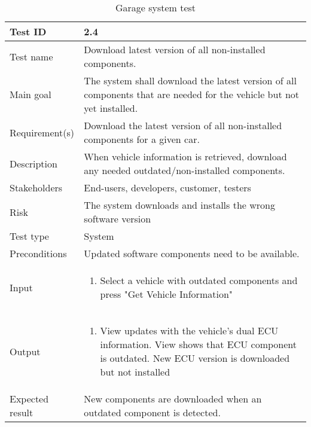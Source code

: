 \begin{table}[H]
\centering
\caption{Garage system test}
\begin{tabularx}{1.0\textwidth}{
    |p{}     %
    |p{}|    %
}
\hline

Test ID
& 2.4
\\
\hline

Test name
& Download latest version of all non-installed components.
\\
\hline

Main goal
& The system shall download the latest version of all components that are needed for the vehicle but not yet installed.
\\
\hline

Requirement(s)
& Download the latest version of all non-installed components for a given car.
\\
\hline

Description
& When vehicle information is retrieved, download any needed outdated/non-installed components.
\\
\hline

Stakeholders
& End-users, developers, customer, testers
\\
\hline

Risk
& The system downloads and installs the wrong software version
\\
\hline

Test type
& System
\\
\hline

Preconditions
& Updated software components need to be available.
\\
\hline

Input
& \begin{enumerate}
    \item Select a vehicle with outdated components and press "Get Vehicle Information"
\end{enumerate}
\\
\hline

Output
& \begin{enumerate}
    \item View updates with the vehicle's dual ECU information. View shows that ECU component is outdated. New ECU version is downloaded but not installed
\end{enumerate}
\\
\hline

Expected result
& New components are downloaded when an outdated component is detected.
\\
\hline


\end{tabularx}
\end{table}
